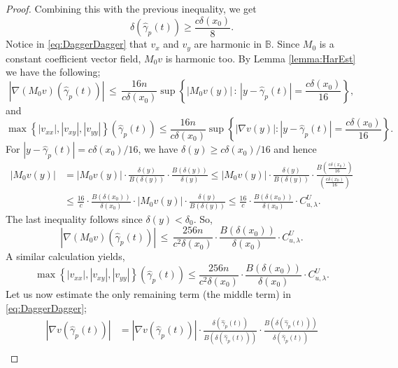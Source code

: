 \documentclass[12pt,a4paper]{amsart}
\numberwithin{equation}{section}
\theoremstyle{definition}
\begin{document}
\begin{proof}
Combining this with the previous inequality, we get
\[\delta(\widehat{\gamma}_p(t)) \ge \frac{c\delta(x_0)}{8}.\]
Notice in \eqref{eq:DaggerDagger} that $v_x$ and $v_y$ are harmonic in $\mathbb{B}$. Since $M_0$ is a constant coefficient vector field, $M_0 v$ is harmonic too. By Lemma \ref{lemma:HarEst} we have the following;
\[{\left\lvert{\nabla(M_0 v)(\widehat{\gamma}_p(t))}\right\rvert} \,\le\, \frac{16n}{c\delta(x_0)}\sup\left\{ {\left\lvert{M_0v(y)}\right\rvert}\, :\, {\left\lvert{y-\widehat{\gamma}_p(t)}\right\rvert} = \frac{c\delta(x_0)}{16}\right\},\]
and
\[\max\left\{{\left\lvert{v_{xx}}\right\rvert}, {\left\lvert{v_{xy}}\right\rvert}, {\left\lvert{v_{yy}}\right\rvert}\right\}(\widehat{\gamma}_p(t)) \le \frac{16n}{c\delta(x_0)}\sup\left\{ {\left\lvert{\nabla v(y)}\right\rvert} : {\left\lvert{y-\widehat{\gamma}_p(t)}\right\rvert} = \frac{c\delta(x_0)}{16}\right\}.\]
For ${\left\lvert{y-\widehat{\gamma}_p(t)}\right\rvert} = c\delta(x_0)/16$, we have $\delta(y) \ge c\delta(x_0)/16$ and hence
\begin{align*}
{\left\lvert{M_0v(y)}\right\rvert} &= {\left\lvert{M_0v(y)}\right\rvert} \cdot \frac{\delta(y)}{B(\delta(y))} \cdot \frac{B(\delta(y))}{\delta(y)} \le {\left\lvert{M_0v(y)}\right\rvert} \cdot\frac{\delta(y)}{B(\delta(y))}\cdot \frac{B\left(\frac{c\delta(x_0)}{16}\right)}{\left(\frac{c\delta(x_0)}{16}\right)}\\
& \le \frac{16}{c}\cdot\frac{B(\delta(x_0))}{\delta(x_0)}\cdot{\left\lvert{M_0v(y)}\right\rvert} \cdot \frac{\delta(y)}{B(\delta(y))} \le \frac{16}{c}\cdot\frac{B(\delta(x_0))}{\delta(x_0)}\cdot C_{u,\lambda}^U.
\end{align*}
The last inequality follows since $\delta(y) < \delta_0$. So,
\[{\left\lvert{\nabla(M_0 v)(\widehat{\gamma}_p(t))}\right\rvert} \,\le\, \frac{256n}{c^2\delta(x_0)}\cdot\frac{B(\delta(x_0))}{\delta(x_0)}\cdot C_{u, \lambda}^U.\]
A similar calculation yields,
\[\max\left\{{\left\lvert{v_{xx}}\right\rvert}, {\left\lvert{v_{xy}}\right\rvert}, {\left\lvert{v_{yy}}\right\rvert}\right\}(\widehat{\gamma}_p(t)) \le \frac{256n}{c^2\delta(x_0)}\cdot\frac{B(\delta(x_0))}{\delta(x_0)}\cdot C_{u,\lambda}^U.\]
Let us now estimate the only remaining term (the middle term) in \eqref{eq:DaggerDagger};
\begin{align*}
{\left\lvert{\nabla v(\widehat{\gamma}_p(t))}\right\rvert} &= {\left\lvert{\nabla v(\widehat{\gamma}_p(t))}\right\rvert} \cdot \frac{\delta(\widehat{\gamma}_p(t))}{B(\delta(\widehat{\gamma}_p(t)))} \cdot \frac{B(\delta(\widehat{\gamma}_p(t)))}{\delta(\widehat{\gamma}_p(t))}\\

\end{align*}
\end{proof}
\end{document}
